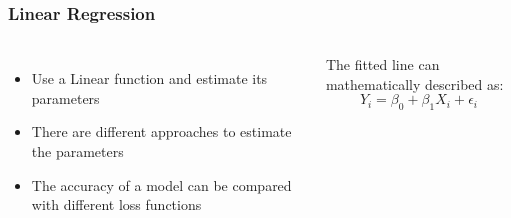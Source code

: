 \documentclass{beamer}
\begin{document}
\begin{frame}
\frametitle{Linear Regression}
\begin{columns}[c] %

\begin{itemize}
\item Use a Linear function and estimate its parameters
\item There are different approaches to estimate the parameters
\item The accuracy of a model can be compared with different loss functions
\end{itemize}

The fitted line can mathematically described as:
\begin{equation}
Y_i = \beta_0 + \beta_1 X_i + \epsilon_i
\end{equation}

\end{columns}
\end{frame}

\end{document}
